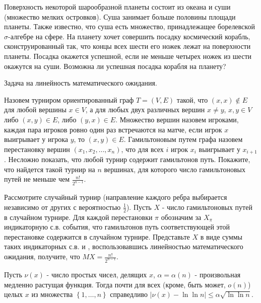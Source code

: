 \begin{problem}
Поверхность некоторой шарообразной планеты состоит из океана и суши (множество мелких островков). Суша занимает больше половины 
площади планеты. Также известно, что суша есть множество, принадлежащее борелевской  $\sigma$-алгебре на сфере. На планету хочет 
совершить посадку космический корабль, сконструированный так, что концы всех шести его ножек лежат на поверхности планеты. 
Посадка окажется успешной, если не меньше четырех ножек из шести окажутся на суши. Возможна ли успешная посадка корабля на планету?
\end{problem}

\begin{ordre}
Задача на линейность математического ожидания.
\end{ordre}

\begin{problem}
Назовем турниром ориентированный граф $T=(V,E)$ такой, что $(x,x)\notin E$ для любой вершины $x\in V$, а для любых двух различных вершин $x\ne y$, $x,y\in V$ либо $(x,y)\in E$, либо $(y,x)\in E$. Множество вершин назовем игроками, каждая пара игроков ровно один раз встречаются на матче, если игрок $x$ выигрывает у игрока $y$, то $(x,y)\in E$. Гамильтоновым путем графа назовем перестановку вершин $(x_{1} ,x_{2} ,\ldots ,x_{n} )$, что для всех $i$ игрок $x_{i} $ выигрывает у $x_{i+1} $. Несложно показать, что любой турнир содержит гамильтонов путь. Покажите, что найдется такой турнир на $n$ вершинах, для которого число гамильтоновых путей не меньше чем $\frac{n!}{2^{n-1} } $.
\end{problem}

\begin{ordre}

Рассмотрите случайный турнир (направление каждого ребра выбирается независимо от других с вероятностью $\frac{1}{2} $). Пусть $X$ - число гамильтоновых путей в случайном турнире. Для каждой перестановки $\pi $ обозначим за $X_{\pi } $ индикаторную с.в. события, что гамильтонов путь соответствующей этой перестановке содержится в случайном турнире. Представьте $X$ в виде суммы таких индикаторных с.в. и , воспользовавшись линейностью математического ожидания, получите, что $MX=\frac{n!}{2^{n-1} } $.
\end{ordre}

\begin{problem}
Пусть $\nu (x)$ - число простых чисел, делящих $x$, $\alpha =\alpha (n)$ - произвольная медленно растущая функция. Тогда почти для всех (кроме, быть может, $o(n)$) целых $x$ из множества $\left\{1,\ldots ,n\right\}$ справедливо $\left|\nu (x)-\ln \ln n\right|\le \alpha \sqrt{\ln \ln n} $.
\end{problem}

